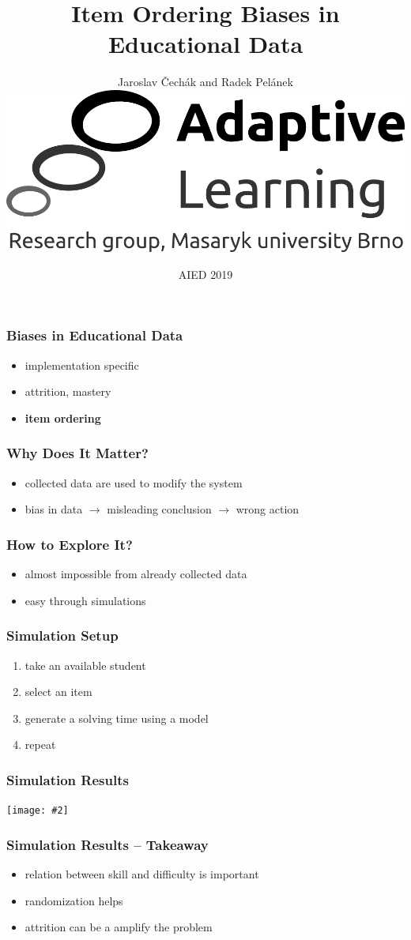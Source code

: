 \documentclass[bigger]{beamer}
\title{Item Ordering Biases in Educational Data}
\author{Jaroslav \v{C}ech\'ak and Radek Pel\'anek\\[10mm]
\includegraphics[width=.3\linewidth]{al-logo}
}
\date{AIED 2019}
\newcommand{\img}[2]{
  \begin{center}
    \texttt{[image: \#2]}
  \end{center}
}
\begin{document}
\frame{\titlepage}

\begin{frame}
  \frametitle{Biases in Educational Data}

  \begin{itemize}
      \item implementation specific
      \item attrition, mastery
      \item \textbf{item ordering}
  \end{itemize}
\end{frame}

\begin{frame}
  \frametitle{Why Does It Matter?}
  \begin{itemize}
      \item collected data are used to modify the system
      \item bias in data $\rightarrow$ misleading conclusion $\rightarrow$ wrong action
  \end{itemize}
\end{frame}

\begin{frame}
  \frametitle{How to Explore It?}
  \begin{itemize}
      \item almost impossible from already collected data
      \item easy through simulations
  \end{itemize}
\end{frame}

\begin{frame}
  \frametitle{Simulation Setup}
  \begin{enumerate}
  \item take an available student
  \item select an item
  \item generate a solving time using a model
  \item repeat
  \end{enumerate}
\end{frame}

\begin{frame}
  \frametitle{Simulation Results}

  \img{1}{problem-ordering-bias}
\end{frame}

\begin{frame}
  \frametitle{Simulation Results -- Takeaway}

  \begin{itemize}
  \item relation between skill and difficulty is important
  \item randomization helps
  \item attrition can be a amplify the problem
  \end{itemize}
\end{frame}
\end{document}
